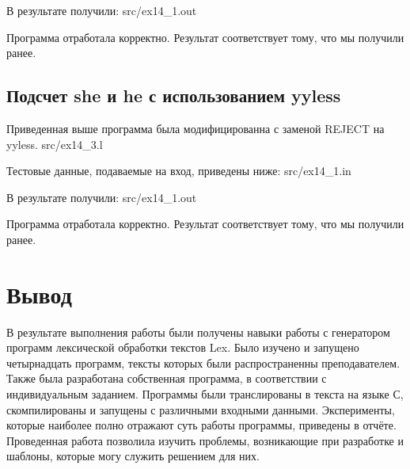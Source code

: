     В результате получили:
     {src/ex14_1.out}

    Программа отработала корректно. Результат соответствует тому, что мы получили ранее.

\subsection{Подсчет she и he с использованием yyless}

    Приведенная выше программа была модифицированна с заменой REJECT на yyless.
     {src/ex14_3.l}

    Тестовые данные, подаваемые на вход, приведены ниже:
     {src/ex14_1.in}
    
    В результате получили:
     {src/ex14_1.out}

    Программа отработала корректно. Результат соответствует тому, что мы получили ранее.


\section{Вывод}

В результате выполнения работы были получены навыки работы с генератором программ лексической обработки текстов Lex. 
Было изучено и запущено четырнадцать программ, тексты которых были распространенны преподавателем. Также была разработана собственная программа,
в соответствии с индивидуальным заданием. 
Программы были транслированы в текста на языке С, скомпилированы и запущены с различными входными данными. Эксперименты, которые наиболее полно
отражают суть работы программы, приведены в отчёте.
Проведенная работа позволила изучить проблемы, возникающие при разработке и шаблоны,
которые могу служить решением для них.



